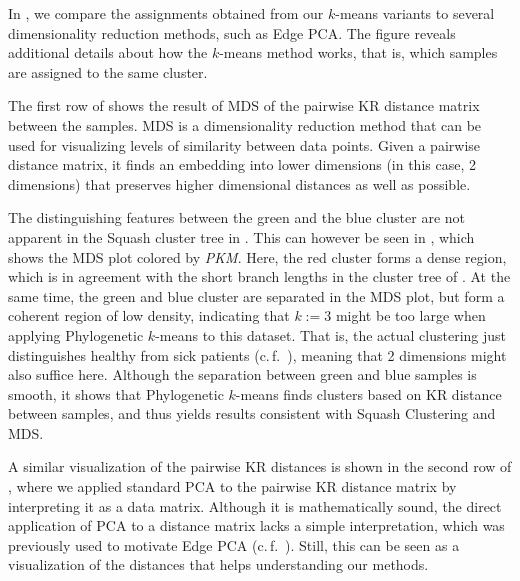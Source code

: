 In , we compare the assignments obtained from our $k$-means variants
to several dimensionality reduction methods, such as Edge PCA.
The figure reveals additional details about how the $k$-means method works,
that is, which samples are assigned to the same cluster.

The first row of  shows the result of
\acf{MDS} of the pairwise KR distance matrix between the samples.
\ac{MDS} \cite{Mardia1978,Krzanowski1994,Everitt2010} is a dimensionality reduction method that
can be used for visualizing levels of similarity between data points.
Given a pairwise distance matrix, it finds an embedding into lower dimensions (in this case, \num{2} dimensions)
that preserves higher dimensional distances as well as possible.

The distinguishing features between the green and the blue cluster
are not apparent in the Squash cluster tree in .
This can however be seen in , which shows the \ac{MDS} plot colored by \emph{PKM}.
Here, the red cluster forms a dense region, which is in agreement with the short branch lengths
in the cluster tree of .
At the same time, the green and blue cluster are separated in the \ac{MDS} plot,
but form a coherent region of low density,
indicating that $k:=3$ might be too large when applying Phylogenetic $k$-means to this dataset.
That is, the actual clustering just distinguishes healthy from sick patients (c.\,f.~),
meaning that \num{2} dimensions might also suffice here.
Although the separation between green and blue samples is smooth,
it shows that Phylogenetic $k$-means finds clusters based on KR distance between samples,
and thus yields results consistent with Squash Clustering and \ac{MDS}.

A similar visualization of the pairwise KR distances is shown in the second row of ,
where we applied standard \acf{PCA} \cite{Krzanowski1994,Everitt2010} to the pairwise KR distance matrix
by interpreting it as a data matrix.
Although it is mathematically sound, the direct application of \ac{PCA} to a distance matrix lacks a simple interpretation,
which was previously used to motivate Edge PCA
(c.\,f.~).
Still, this can be seen as a visualization of the distances that helps understanding our methods.

